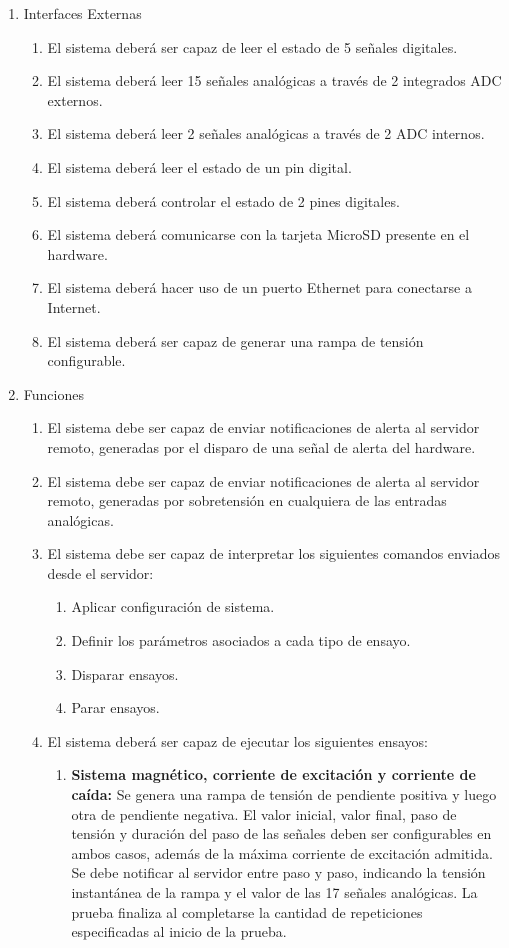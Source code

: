 \documentclass[11pt]{charter}
\begin{document}
\begin{enumerate}
\item Interfaces Externas
	\begin{enumerate}
	\item El sistema deberá ser capaz de leer el estado de 5 señales digitales.
	\item El sistema deberá leer 15 señales analógicas a través de 2 integrados ADC externos.
	\item El sistema deberá leer 2 señales analógicas a través de 2 ADC internos.
	\item El sistema deberá leer el estado de un pin digital.
	\item El sistema deberá controlar el estado de 2 pines digitales.
	\item El sistema deberá comunicarse con la tarjeta MicroSD presente en el hardware.
	\item El sistema deberá hacer uso de un puerto Ethernet para conectarse a Internet.
	\item El sistema deberá ser capaz de generar una rampa de tensión configurable.
	\end{enumerate}
\item Funciones
	\begin{enumerate}
	\item El sistema debe ser capaz de enviar notificaciones de alerta al servidor remoto, generadas por el disparo de una señal de alerta del hardware.
	\item El sistema debe ser capaz de enviar notificaciones de alerta al servidor remoto, generadas por sobretensión en cualquiera de las entradas analógicas.
	\item El sistema debe ser capaz de interpretar los siguientes comandos enviados desde el servidor:
		\begin{enumerate}
		\item Aplicar configuración de sistema.
		\item Definir los parámetros asociados a cada tipo de ensayo.
		\item Disparar ensayos.
		\item Parar ensayos.
		\end{enumerate}
	\item El sistema deberá ser capaz de ejecutar los siguientes ensayos:
		\begin{enumerate}
		\item \textbf{Sistema magnético, corriente de excitación y corriente de caída:} Se genera una rampa de tensión de pendiente positiva y luego otra de pendiente negativa. El valor inicial, valor final, paso de tensión y duración del paso de las señales deben ser configurables en ambos casos, además de la máxima corriente de excitación admitida. Se debe notificar al servidor entre paso y paso, indicando la tensión instantánea de la rampa y el valor de las 17 señales analógicas. La prueba finaliza al completarse la cantidad de repeticiones especificadas al inicio de la prueba.

\end{enumerate}
\end{enumerate}
\end{enumerate}
\end{document}
